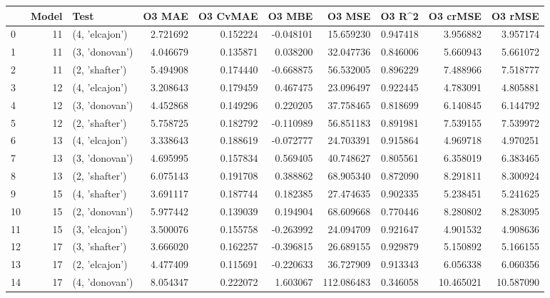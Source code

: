 \begin{tabular}{lrlrrrrrrr}
\toprule
{} &  Model &            Test &    O3 MAE &  O3 CvMAE &    O3 MBE &      O3 MSE &    O3 R\textasciicircum2 &   O3 crMSE &    O3 rMSE \\
\midrule
0  &     11 &  (4, 'elcajon') &  2.721692 &  0.152224 & -0.048101 &   15.659230 &  0.947418 &   3.956882 &   3.957174 \\
1  &     11 &  (3, 'donovan') &  4.046679 &  0.135871 &  0.038200 &   32.047736 &  0.846006 &   5.660943 &   5.661072 \\
2  &     11 &  (2, 'shafter') &  5.494908 &  0.174440 & -0.668875 &   56.532005 &  0.896229 &   7.488966 &   7.518777 \\
3  &     12 &  (4, 'elcajon') &  3.208643 &  0.179459 &  0.467475 &   23.096497 &  0.922445 &   4.783091 &   4.805881 \\
4  &     12 &  (3, 'donovan') &  4.452868 &  0.149296 &  0.220205 &   37.758465 &  0.818699 &   6.140845 &   6.144792 \\
5  &     12 &  (2, 'shafter') &  5.758725 &  0.182792 & -0.110989 &   56.851183 &  0.891981 &   7.539155 &   7.539972 \\
6  &     13 &  (4, 'elcajon') &  3.338643 &  0.188619 & -0.072777 &   24.703391 &  0.915864 &   4.969718 &   4.970251 \\
7  &     13 &  (3, 'donovan') &  4.695995 &  0.157834 &  0.569405 &   40.748627 &  0.805561 &   6.358019 &   6.383465 \\
8  &     13 &  (2, 'shafter') &  6.075143 &  0.191708 &  0.388862 &   68.905340 &  0.872090 &   8.291811 &   8.300924 \\
9  &     15 &  (4, 'shafter') &  3.691117 &  0.187744 &  0.182385 &   27.474635 &  0.902335 &   5.238451 &   5.241625 \\
10 &     15 &  (2, 'donovan') &  5.977442 &  0.139039 &  0.194904 &   68.609668 &  0.770446 &   8.280802 &   8.283095 \\
11 &     15 &  (3, 'elcajon') &  3.500076 &  0.155758 & -0.263992 &   24.094709 &  0.921647 &   4.901532 &   4.908636 \\
12 &     17 &  (3, 'shafter') &  3.666020 &  0.162257 & -0.396815 &   26.689155 &  0.929879 &   5.150892 &   5.166155 \\
13 &     17 &  (2, 'elcajon') &  4.477409 &  0.115691 & -0.220633 &   36.727909 &  0.913343 &   6.056338 &   6.060356 \\
14 &     17 &  (4, 'donovan') &  8.054347 &  0.222072 &  1.603067 &  112.086483 &  0.346058 &  10.465021 &  10.587090 \\

\end{tabular}
